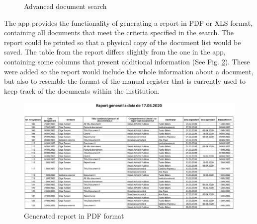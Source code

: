 \begin{figure}[ht]
    \centering
    \qquad
    \caption{Advanced document search}
    \label{advancedSearch}
\end{figure}

The app provides the functionality of generating a report in PDF or XLS format, containing all documents that meet the criteria specified in the search. The report could be printed so that a physical copy of the document list would be saved. The table from the report differs slightly from the one in the app, containing some columns that present additional information (See Fig. \ref{pdfReport}). These were added so the report would include the whole information about a document, but also to resemble the format of the manual register that is currently used to keep track of the documents within the institution.

\begin{figure}[H]
    \centering
    \includegraphics[width=5.5in]{images/app/report_pdf}
    \caption{Generated report in PDF format}
    \label{pdfReport}
\end{figure}

